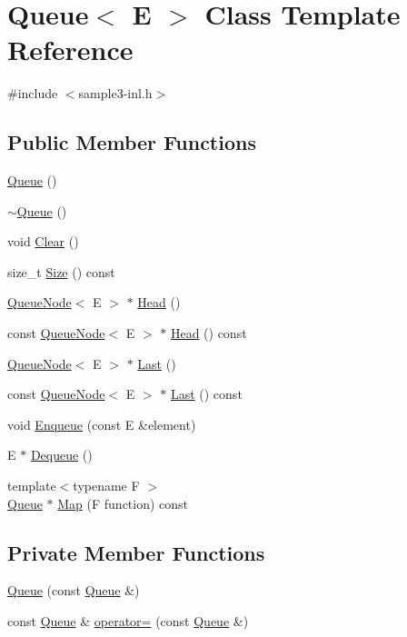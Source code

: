 \hypertarget{classQueue}{}\section{Queue$<$ E $>$ Class Template Reference}
\label{classQueue}


{\ttfamily \#include $<$sample3-\/inl.\+h$>$}

\subsection*{Public Member Functions}
\begin{DoxyCompactItemize}
\item 
\hyperlink{classQueue_ab09891e54b51dc677ee6efb350687ae4}{Queue} ()
\item 
\hyperlink{classQueue_a49fe82adb8dc2fb62ab53876a6933d0f}{$\sim$\+Queue} ()
\item 
void \hyperlink{classQueue_acfdd5f9f7e936ca30dcf877370ef9510}{Clear} ()
\item 
size\+\_\+t \hyperlink{classQueue_abc4d78b5f66041011c5590bf703847b0}{Size} () const
\item 
\hyperlink{classQueueNode}{Queue\+Node}$<$ E $>$ $\ast$ \hyperlink{classQueue_a71aa0154ef75bb87a53b6af1829fcd5e}{Head} ()
\item 
const \hyperlink{classQueueNode}{Queue\+Node}$<$ E $>$ $\ast$ \hyperlink{classQueue_a6c906075e0ad2d1f0634990aa106395e}{Head} () const
\item 
\hyperlink{classQueueNode}{Queue\+Node}$<$ E $>$ $\ast$ \hyperlink{classQueue_a430aca3d3b9f5fd588b215028d134b74}{Last} ()
\item 
const \hyperlink{classQueueNode}{Queue\+Node}$<$ E $>$ $\ast$ \hyperlink{classQueue_a7c8c2c64700dfe1df8bf266572cf101a}{Last} () const
\item 
void \hyperlink{classQueue_abaa2e7175457307bca74f5562cbdaaa9}{Enqueue} (const E \&element)
\item 
E $\ast$ \hyperlink{classQueue_a434d465001c3078e999f7a89a8af84c0}{Dequeue} ()
\item 
{\footnotesize template$<$typename F $>$ }\\\hyperlink{classQueue}{Queue} $\ast$ \hyperlink{classQueue_a904a696292fc593adc6fd21fb229d760}{Map} (F function) const
\end{DoxyCompactItemize}
\subsection*{Private Member Functions}
\begin{DoxyCompactItemize}
\item 
\hyperlink{classQueue_ac071ee553005a67737d35edeeaafca5b}{Queue} (const \hyperlink{classQueue}{Queue} \&)
\item 
const \hyperlink{classQueue}{Queue} \& \hyperlink{classQueue_adf6f3eb046365f1b67b6c0bd5da2da59}{operator=} (const \hyperlink{classQueue}{Queue} \&)
\end{DoxyCompactItemize}
